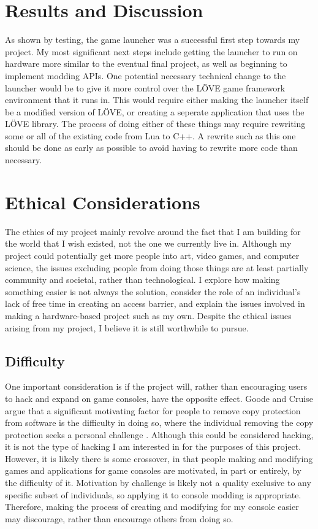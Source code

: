 \documentclass[10pt,twocolumn]{article}
\begin{document}
\section{Results and Discussion}

As shown by testing, the game launcher was a successful first step towards my
project. My most significant next steps include getting the launcher to run on
hardware more similar to the eventual final project, as well as beginning to
implement modding APIs. One potential necessary technical change to the launcher
would be to give it more control over the LÖVE
game framework environment that
it runs in. This would require either making the launcher itself be a modified
version of
LÖVE, or creating a seperate application that uses the LÖVE
library.
The process of doing either of these things may require rewriting some or all of
the existing code from Lua to C++. A rewrite such as this one should be done as
early as possible to avoid having to rewrite more code than necessary.

\section{Ethical Considerations}

The ethics of my project mainly revolve around the fact that I am building
for the world that I wish existed, not the one we currently live in. Although my
project could potentially get more people into art, video games, and computer
science, the issues excluding people from doing those things are at least
partially community and societal, rather than technological.
I explore how making
something easier is not always the solution, consider the role of an
individual's lack of free time in creating an access barrier, and explain the
issues involved in making a hardware-based project such as my own. Despite the
ethical issues arising from my project, I believe it is still worthwhile to
pursue.

\subsection{Difficulty}

One important consideration is if the project will, rather than encouraging
users to hack and expand on game consoles, have the opposite effect.
Goode and Cruise argue that a significant motivating factor for people to remove
copy protection from software is the difficulty in doing so, where the
individual removing the copy protection seeks a personal challenge
\cite{goode_what_2006}. Although this could be considered hacking, it is not the
type of hacking I am interested in for the purposes of this project. However, it
is likely there is some crossover, in that people making and modifying games and
applications for game consoles are motivated, in part or entirely, by the
difficulty of it. Motivation by challenge is likely not a quality exclusive to
any specific subset of individuals, so applying it to console modding is
appropriate. Therefore, making the process of creating and modifying for my
console easier may discourage, rather than encourage others from doing so.
\end{document}
